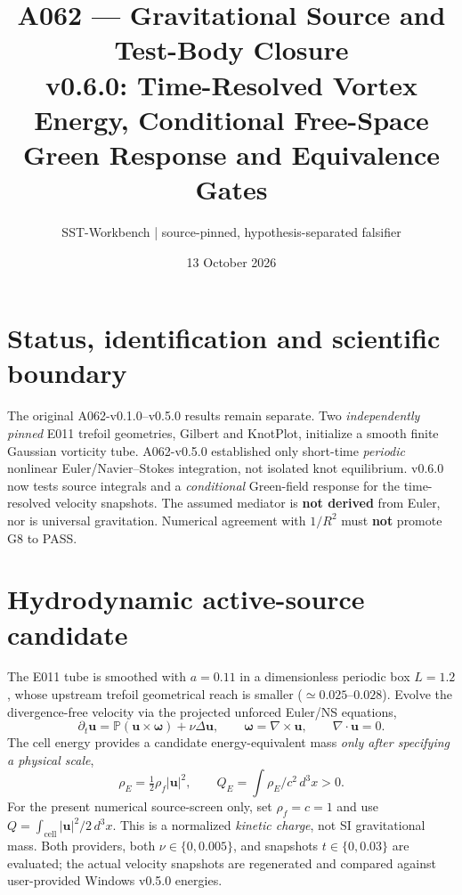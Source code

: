 \documentclass[10pt,a4paper]{article}
\title{A062 --- Gravitational Source and Test-Body Closure\\
\large v0.6.0: Time-Resolved Vortex Energy, Conditional Free-Space Green Response and Equivalence Gates}
\author{SST-Workbench | source-pinned, hypothesis-separated falsifier}
\date{13 October 2026}
\begin{document}
\maketitle
\section{Status, identification and scientific boundary}
The original A062-v0.1.0--v0.5.0 results remain separate. Two \emph{independently pinned} E011 trefoil geometries, Gilbert and KnotPlot, initialize a smooth finite Gaussian vorticity tube. A062-v0.5.0 established only short-time \emph{periodic} nonlinear Euler/Navier--Stokes integration, not isolated knot equilibrium. v0.6.0 now tests source integrals and a \emph{conditional} Green-field response for the time-resolved velocity snapshots. The assumed mediator is \textbf{not derived} from Euler, nor is universal gravitation. Numerical agreement with $1/R^2$ must \textbf{not} promote G8 to PASS.
\section{Hydrodynamic active-source candidate}
The E011 tube is smoothed with $a=0.11$ in a dimensionless periodic box $L=1.2$, whose upstream trefoil geometrical reach is smaller ($\simeq0.025$--$0.028$). Evolve the divergence-free velocity via the projected unforced Euler/NS equations,
\begin{equation}
\partial_t\mathbf{u}=\mathbb{P}(\mathbf u\times\boldsymbol\omega)+\nu\Delta\mathbf u,
\qquad \boldsymbol\omega=\nabla\times\mathbf u,\qquad \nabla\cdot\mathbf u=0.
\end{equation}
The cell energy provides a candidate energy-equivalent mass \emph{only after specifying a physical scale},
\begin{equation}
\rho_E=\tfrac12\rho_f|\mathbf{u}|^2,\qquad Q_E=\int\rho_E/c^2\,d^3x>0.
\end{equation}
For the present numerical source-screen only, set $\rho_f=c=1$ and use $Q=\int_{\mathrm{cell}} |\mathbf u|^2/2\,d^3x$. This is a normalized \emph{kinetic charge}, not SI gravitational mass. Both providers, both $\nu\in\{0,0.005\}$, and snapshots $t\in\{0,0.03\}$ are evaluated; the actual velocity snapshots are regenerated and compared against user-provided Windows v0.5.0 energies.
\end{document}

